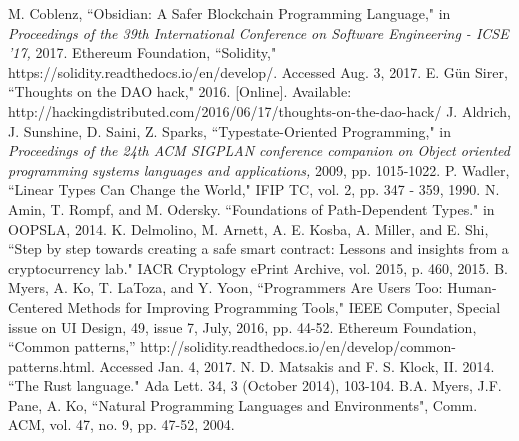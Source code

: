 \documentclass[sigplan,10pt,review]{acmart}\settopmatter{printfolios=true}
\begin{document}
\begin{thebibliography}{9}
	M. Coblenz, ``Obsidian: A Safer Blockchain Programming Language," 
	in \emph{Proceedings of the 39th International Conference on Software Engineering -
	ICSE '17,} 2017.
	Ethereum Foundation, ``Solidity," https://solidity.readthedocs.io/en/develop/. Accessed Aug. 3, 2017.
	E. G{\"u}n Sirer, ``Thoughts on the DAO hack," 2016. [Online]. 
	Available: http://hackingdistributed.com/2016/06/17/thoughts-on-the-dao-hack/
	J. Aldrich, J. Sunshine, D. Saini, Z. Sparks,
	``Typestate-Oriented Programming,"
	in \emph{Proceedings of the 24th ACM SIGPLAN conference companion on Object oriented 
	programming systems languages and applications,} 2009, pp. 1015-1022.
	P. Wadler, ``Linear Types Can Change the World,"
	IFIP TC, vol. 2, pp. 347 - 359, 1990.
	 N. Amin, T. Rompf, and M. Odersky. ``Foundations of Path-Dependent Types."
	 in OOPSLA, 2014.
	K. Delmolino, M. Arnett, A. E. Kosba, A. Miller, and E. Shi, 
	``Step by step towards creating a safe smart contract: Lessons and insights from a cryptocurrency lab."
	IACR Cryptology ePrint Archive, vol. 2015, p. 460, 2015.
	B. Myers, A. Ko, T. LaToza, and Y. Yoon, 
	``Programmers Are Users Too: Human-Centered Methods for Improving Programming Tools,"
	IEEE Computer, Special issue on UI Design, 49, issue 7, July, 2016, pp. 44-52.
	Ethereum Foundation, ``Common patterns,''
	http://solidity.readthedocs.io/en/develop/common-patterns.html.
	Accessed Jan. 4, 2017.
	N. D. Matsakis and F. S. Klock, II. 2014. ``The Rust language." Ada Lett. 34, 3 (October 2014), 103-104.
	B.A. Myers, J.F. Pane, A. Ko, ``Natural Programming Languages and Environments", Comm. ACM, vol. 47, no. 9, pp. 47-52, 2004.	
\end{thebibliography}
\end{document}

